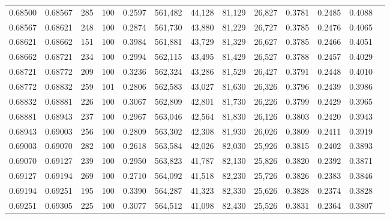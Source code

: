 \begin{tabular}{rrrrrrrrrrrrr}
0.68500 & 0.68567 &   285 & 100 &                                     0.2597 & 561,482 &  44,128 &  81,129 &  26,827 & 0.3781 & 0.2485 & 0.4088 \\
0.68567 & 0.68621 &   248 & 100 &                                     0.2874 & 561,730 &  43,880 &  81,229 &  26,727 & 0.3785 & 0.2476 & 0.4065 \\
0.68621 & 0.68662 &   151 & 100 &                                     0.3984 & 561,881 &  43,729 &  81,329 &  26,627 & 0.3785 & 0.2466 & 0.4051 \\
0.68662 & 0.68721 &   234 & 100 &                                     0.2994 & 562,115 &  43,495 &  81,429 &  26,527 & 0.3788 & 0.2457 & 0.4029 \\
0.68721 & 0.68772 &   209 & 100 &                                     0.3236 & 562,324 &  43,286 &  81,529 &  26,427 & 0.3791 & 0.2448 & 0.4010 \\
0.68772 & 0.68832 &   259 & 101 &                                     0.2806 & 562,583 &  43,027 &  81,630 &  26,326 & 0.3796 & 0.2439 & 0.3986 \\
0.68832 & 0.68881 &   226 & 100 &                                     0.3067 & 562,809 &  42,801 &  81,730 &  26,226 & 0.3799 & 0.2429 & 0.3965 \\
0.68881 & 0.68943 &   237 & 100 &                                     0.2967 & 563,046 &  42,564 &  81,830 &  26,126 & 0.3803 & 0.2420 & 0.3943 \\
0.68943 & 0.69003 &   256 & 100 &                                     0.2809 & 563,302 &  42,308 &  81,930 &  26,026 & 0.3809 & 0.2411 & 0.3919 \\
0.69003 & 0.69070 &   282 & 100 &                                     0.2618 & 563,584 &  42,026 &  82,030 &  25,926 & 0.3815 & 0.2402 & 0.3893 \\
0.69070 & 0.69127 &   239 & 100 &                                     0.2950 & 563,823 &  41,787 &  82,130 &  25,826 & 0.3820 & 0.2392 & 0.3871 \\
0.69127 & 0.69194 &   269 & 100 &                                     0.2710 & 564,092 &  41,518 &  82,230 &  25,726 & 0.3826 & 0.2383 & 0.3846 \\
0.69194 & 0.69251 &   195 & 100 &                                     0.3390 & 564,287 &  41,323 &  82,330 &  25,626 & 0.3828 & 0.2374 & 0.3828 \\
0.69251 & 0.69305 &   225 & 100 &                                     0.3077 & 564,512 &  41,098 &  82,430 &  25,526 & 0.3831 & 0.2364 & 0.3807 \\

\end{tabular}
